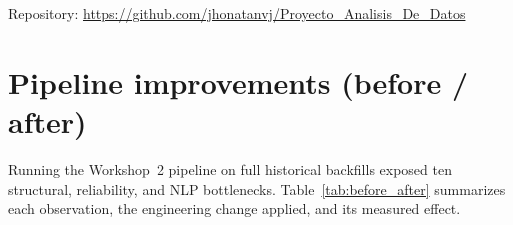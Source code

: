 \documentclass[11pt,a4paper]{article}
\begin{document}
\vspace{6pt}
Repository: \url{https://github.com/jhonatanvj/Proyecto_Analisis_De_Datos}

\section{Pipeline improvements (before / after)}\label{sec:improvements}

Running the Workshop~2 pipeline on full historical backfills exposed ten structural, reliability, and NLP bottlenecks. Table~\ref{tab:before_after} summarizes each observation, the engineering change applied, and its measured effect.
\end{document}

